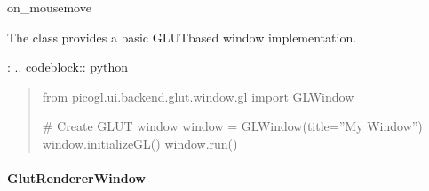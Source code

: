 \documentclass[a4paper,10pt,english,openany,oneside]{sphinxmanual}
\begin{document}
\begin{fulllineitems}
\begin{fulllineitems}
\end{fulllineitems}


\begin{fulllineitems}
\label{\detokenize{api/ui:picogl.ui.backend.glut.window.gl.GLWindow.mouseMoveEvent}}
\pysigstartsignatures
\pysiglinewithargsret
{}
{\sphinxparamcomma {}}
{}
\pysigstopsignatures
\sphinxAtStartPar
on\_mousemove

\end{fulllineitems}


\begin{fulllineitems}
\label{\detokenize{api/ui:picogl.ui.backend.glut.window.gl.GLWindow.run}}
\pysigstartsignatures
\pysiglinewithargsret
{}
{}
{}
\pysigstopsignatures
\end{fulllineitems}


\end{fulllineitems}


\sphinxAtStartPar
The  class provides a basic GLUT\sphinxhyphen{}based window implementation.

\sphinxAtStartPar
{}:
.. code\sphinxhyphen{}block:: python
\begin{quote}

\sphinxAtStartPar
from picogl.ui.backend.glut.window.gl import GLWindow

\sphinxAtStartPar
\# Create GLUT window
window = GLWindow(title=”My Window”)
window.initializeGL()
window.run()
\end{quote}


\paragraph{GlutRendererWindow}
\label{\detokenize{api/ui:glutrendererwindow}}
\end{document}

